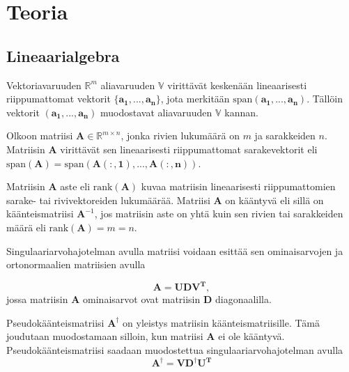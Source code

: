 \section{Teoria}

\subsection{Lineaarialgebra}
Vektoriavaruuden $\mathbb{R}^m$ aliavaruuden $\mathbb{V}$ virittävät keskenään lineaarisesti riippumattomat vektorit $\{\mathbf{a_1,...,a_n}\}$, jota merkitään $\text{span}(\mathbf{a_1,...,a_n})$. Tällöin vektorit $(\mathbf{a_1,...,a_n})$ muodostavat aliavaruuden $\mathbb{V}$ kannan. 

Olkoon matriisi $\mathbf{A}\in \mathbb{R}^{m\times n}$, jonka rivien lukumäärä on $\mathit{m}$ ja sarakkeiden $\mathit{n}$. Matriisin \textbf{A} virittävät sen lineaarisesti riippumattomat sarakevektorit eli $\text{span}(\mathbf{A}) = \text{span}(\mathbf{A(:,1),...,A(:,n)})$.

Matriisin \textbf{A} aste eli $\text{rank}(\textbf{A})$ kuvaa matriisin lineaarisesti riippumattomien sarake- tai rivivektoreiden lukumäärää. Matriisi \textbf{A} on kääntyvä eli sillä on käänteismatriisi $\mathbf{A}^{-1}$, jos matriisin aste on yhtä kuin sen rivien tai sarakkeiden määrä eli $\text{rank}(\textbf{A})=m=n$.



Singulaariarvohajotelman avulla matriisi voidaan esittää sen ominaisarvojen ja ortonormaalien matriisien avulla

\begin{equation}
    \mathbf{A = UDV^T,}
\end{equation}
jossa matriisin $\mathbf{A}$ ominaisarvot ovat matriisin $\mathbf{D}$ diagonaalilla. 

Pseudokäänteismatriisi $\mathbf{A^{\dagger}}$ on yleistys matriisin käänteismatriisille. Tämä joudutaan muodostamaan silloin, kun matriisi $\mathbf{A}$ ei ole kääntyvä. Pseudokäänteismatriisi saadaan muodostettua singulaariarvohajotelman avulla
\begin{equation}
    \mathbf{A^{\dagger} = VD^{\dagger}U^T}
\end{equation}

